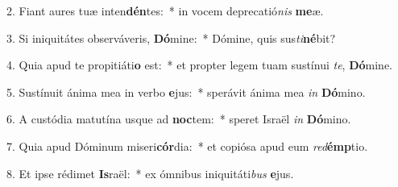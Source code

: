 2. Fiant aures tuæ inten\textbf{dén}tes:~*  in vocem deprecatió\textit{nis} \textbf{me}æ.\

3. Si iniquitátes observáveris, \textbf{Dó}mine:~*  Dómine, quis sus\textit{ti}\textbf{né}bit?\

4. Quia apud te propitiáti\textbf{o} est:~*  et propter legem tuam sustínui \textit{te}, \textbf{Dó}mine.\

5. Sustínuit ánima mea in verbo \textbf{e}jus:~*  sperávit ánima mea \textit{in} \textbf{Dó}mino.\

6. A custódia matutína usque ad \textbf{noc}tem:~*  speret Israël \textit{in} \textbf{Dó}mino.\

7. Quia apud Dóminum miseri\textbf{cór}dia:~*  et copiósa apud eum \textit{red}\textbf{émp}tio.\

8. Et ipse rédimet \textbf{Is}raël:~*  ex ómnibus iniquitáti\textit{bus} \textbf{e}jus.\

